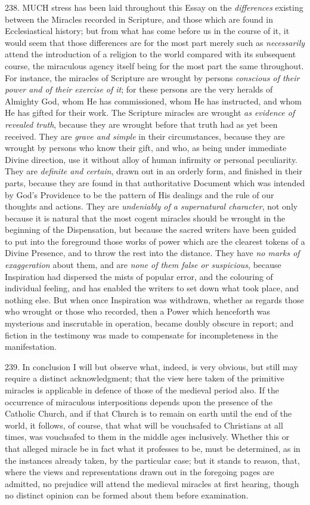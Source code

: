 238.
MUCH stress has been laid
throughout this Essay on the \emph{differences}
existing between the Miracles recorded in Scripture, and those
which are found in Ecclesiastical history; but from what has come
before us in the course of it, it would seem that those differences
are for the most part merely such as \emph{necessarily} attend
the introduction of a religion to the world compared with its
subsequent course, the miraculous agency itself being for the most
part the same throughout. For instance, the miracles of Scripture are
wrought by persons \emph{conscious of
their power and of their exercise of it};
for these persons are the very heralds of Almighty God, whom He
has commissioned, whom He has instructed, and whom He has gifted for
their work. The Scripture miracles are wrought \emph{as
evidence of revealed truth},
because they are wrought before that truth had as yet been
received. They are \emph{grave and simple} in
their circumstances, because they are wrought by persons who know
their gift, and who, as being under immediate Divine direction, use it
without alloy of human infirmity or personal peculiarity. They are \emph{definite and certain}, drawn
out in an orderly form, and finished in their parts, because they are
found in that authoritative Document which was intended by God’s
Providence to be the pattern of His dealings and the rule of our
thoughts and actions. They are \emph{undeniably
of a supernatural character},
not only because it is natural that the most cogent miracles
should be wrought in the beginning of the Dispensation, but because
the sacred writers have been guided to put into the foreground those
works of power which are the clearest tokens of a Divine Presence, and
to throw the rest into the distance. They have \emph{no
marks of exaggeration} about
them, and are \emph{none of them false
or suspicious}, because
Inspiration had dispersed the mists of popular error, and the
colouring of individual feeling, and has enabled the writers to set
down what took place, and nothing else. But when once Inspiration was
withdrawn, whether as regards those who wrought or those who recorded,
then a Power which henceforth was mysterious and inscrutable in
operation, became doubly obscure in report; and fiction in the
testimony was made to compensate for incompleteness in the
manifestation.

239.
In conclusion I will but observe what, indeed, is very obvious,
but still may require a distinct acknowledgment; that the view here
taken of the primitive miracles is applicable in defence of those of
the medieval period also. If the occurrence of miraculous
interpositions depends upon the presence of the Catholic Church, and
if that Church is to remain on earth until the end of the world, it
follows, of course, that what will be vouchsafed to Christians at all
times, was vouchsafed to them in the middle ages inclusively. Whether
this or that alleged miracle be in fact what it professes to be, must
be determined, as in the instances already taken, by the particular
case; but it stands to reason, that, where the views and
representations drawn out in the foregoing pages are admitted, no
prejudice will attend the medieval miracles at first hearing, though
no distinct opinion can be formed about them before examination.

